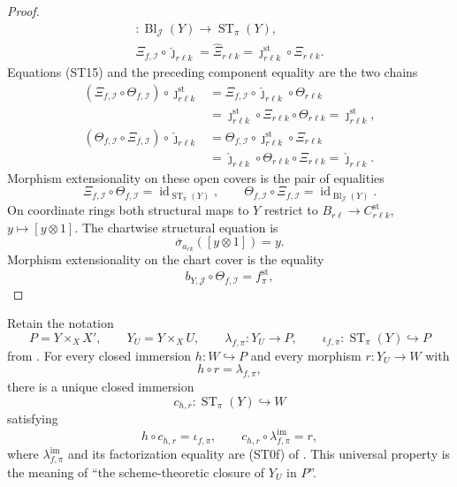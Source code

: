 \begin{proof}
\[\begin{gathered}
      \colon\operatorname{Bl}_{\mathcal J}(Y)\to
        \operatorname{ST}_\pi(Y),\\
    \Xi_{f,\mathcal I}\circ\widehat\jmath_{r\ell k}
      =\widehat\Xi_{r\ell k}
      =\jmath_{r\ell k}^{\mathrm{st}}\circ\Xi_{r\ell k}.
  \end{gathered}
  \]
  Equations (ST15) and the preceding component equality are the two chains
  \[
  \begin{aligned}
    (\Xi_{f,\mathcal I}\circ\Theta_{f,\mathcal I})
      \circ\jmath_{r\ell k}^{\mathrm{st}}
      &=\Xi_{f,\mathcal I}\circ\widehat\jmath_{r\ell k}
          \circ\Theta_{r\ell k}\\
      &=\jmath_{r\ell k}^{\mathrm{st}}\circ\Xi_{r\ell k}
          \circ\Theta_{r\ell k}
       =\jmath_{r\ell k}^{\mathrm{st}},\\
    (\Theta_{f,\mathcal I}\circ\Xi_{f,\mathcal I})
      \circ\widehat\jmath_{r\ell k}
      &=\Theta_{f,\mathcal I}\circ\jmath_{r\ell k}^{\mathrm{st}}
          \circ\Xi_{r\ell k}\\
      &=\widehat\jmath_{r\ell k}\circ\Theta_{r\ell k}
          \circ\Xi_{r\ell k}
       =\widehat\jmath_{r\ell k}.
  \end{aligned}
  \]
  Morphism extensionality on these open covers is the pair of equalities
  \[
    \Xi_{f,\mathcal I}\circ\Theta_{f,\mathcal I}
      =\operatorname{id}_{\operatorname{ST}_\pi(Y)},
    \qquad
    \Theta_{f,\mathcal I}\circ\Xi_{f,\mathcal I}
      =\operatorname{id}_{\operatorname{Bl}_{\mathcal J}(Y)}.
  \]
  On coordinate rings both structural maps to $Y$ restrict to
  $B_{r\ell}\to C^{\mathrm{st}}_{r\ell k}$, $y\mapsto[y\otimes1]$.
  The chartwise structural equation is
  \[
    \overline\sigma_{a_{rk}}([y\otimes1])=y.
  \]
  Morphism extensionality on the chart cover is the equality
  \[
    b_{Y,\mathcal J}\circ\Theta_{f,\mathcal I}
      = f^{\mathrm{st}}_\pi,
  \]
\end{proof}


\begin{lemma}
  \label{lemma:nagata-strict-transform-closure-characterization}

  Retain the notation
  \[
    P=Y\times_XX',\qquad Y_U=Y\times_XU,\qquad
    \lambda_{f,\pi}\colon Y_U\to P,\qquad
    \iota_{f,\pi}\colon\operatorname{ST}_\pi(Y)\hookrightarrow P
  \]
  from .  For every closed immersion
  $h\colon W\hookrightarrow P$ and every morphism $r\colon Y_U\to W$ with
  \[
    h\circ r=\lambda_{f,\pi},
  \]
  there is a unique closed immersion
  \[
    c_{h,r}\colon\operatorname{ST}_\pi(Y)\hookrightarrow W
  \]
  satisfying
  \[
    h\circ c_{h,r}=\iota_{f,\pi},
    \qquad
    c_{h,r}\circ\lambda_{f,\pi}^{\mathrm{im}}=r,
  \]
  where $\lambda_{f,\pi}^{\mathrm{im}}$ and its factorization equality are
  (ST0f) of .  This universal property is the
  meaning of ``the scheme-theoretic closure of $Y_U$ in $P$''.
\end{lemma}


